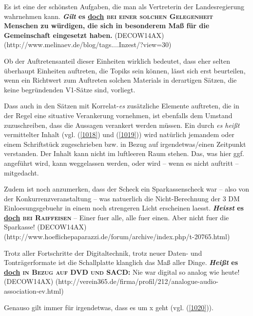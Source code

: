 {\begin{exe}
	\ex\label{1017} 
	\scriptsize
	Es ist eine der schönsten Aufgaben, die man als Vertreterin der Landesregierung wahrnehmen kann.
	\textbf{\textit{Gilt} es \underline{doch} \textsc{bei einer solchen Gelegenheit} Menschen zu würdigen, die sich in besonderem Maß für die Gemeinschaft 		eingesetzt haben.}				
	\hfill\hbox {(DECOW14AX)}
	\newline
	\hbox{}\hfill\hbox{(http://www.melinaev.de/blog/tags....Inzest/?view=30)}	
\end{exe}						   
Ob der Auftretensanteil dieser Einheiten wirklich bedeutet, dass eher selten überhaupt Einheiten auftreten, die Topiks sein können, lässt sich erst beurteilen, wenn ein Richtwert zum Auftreten solchen Materials in derartigen Sätzen, die keine begründenden V1-Sätze sind, vorliegt.

Dass auch in den Sätzen mit Korrelat-\textit{es} zusätzliche Elemente auftreten, die in der Regel eine situative Verankerung vornehmen, ist ebenfalls dem Umstand zuzuschreiben, dass die Aussagen verankert werden müssen. Ein durch \textit{es heißt} vermittelter Inhalt (vgl. (\ref{1018}) und (\ref{1019})) wird natürlich jemandem oder einem Schriftstück zugeschrieben bzw. in Bezug auf irgendetwas/einen Zeitpunkt verstanden. Der Inhalt kann nicht im luftleeren Raum stehen. Das, was hier ggf. angeführt wird, kann weggelassen werden, oder wird – wenn es nicht auftritt – mitgedacht.

\begin{exe}
	\ex\label{1018} 
	\scriptsize
	Zudem ist noch anzumerken, dass der Scheck ein Sparkassenscheck war – also von der Konkurrenz\-veranstaltung – was natuerlich die Nicht-Berechnung der 3 		DM Einloesungsgebuehr in einem noch strengeren Licht erscheinen laesst. \textbf{\textit{Heisst} es \underline{doch} \textsc{bei Raiffeisen}} – \glqq 		Einer fuer alle, alle fuer einen\grqq{}. Aber nicht fuer die Sparkasse! 					
	\hfill\hbox {(DECOW14AX)}
	\newline
	\hbox{}\hfill\hbox{(http://www.hoeflichepaparazzi.de/forum/archive/index.php/t-20765.html)}	
\end{exe}

\begin{exe}
	\ex\label{1019} 
	\scriptsize
	Trotz aller Fortschritte der Digitaltechnik, trotz neuer Daten- und Tonträgerformate ist die Schallplatte klanglich das Maß aller Dinge. 					\textbf{\textit{Heißt} es \underline{doch} \textsc{in Bezug auf DVD und SACD}:} \glqq Nie war digital so analog wie heute!\grqq{} 	 					
	\hfill\hbox {(DECOW14AX)}
	\newline
	\hbox{}\hfill\hbox{(http://verein365.de/firma/profil/212/analogue-audio-association-ev.html)}	
\end{exe}						         
Genauso gilt immer für irgendetwas, dass es um x geht (vgl. (\ref{1020})).

}
